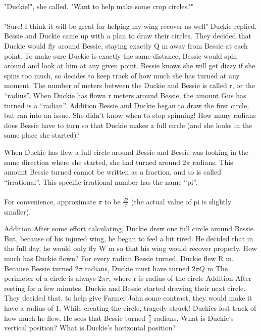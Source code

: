 \documentclass[a4paper,11pt ]{book}
\begin{document}
\paragraph{} "Duckie!", she called. "Want to help make some crop circles?"
\paragraph{} "Sure! I think it will be great for helping my wing recover as well" Duckie replied.
\vfill
\pagebreak
 {Bessie and Duckie came up with a plan to draw their circles. They decided that Duckie would fly around Bessie, staying exactly Q m away from Bessie at each point. To make sure Duckie is exactly the same distance, Bessie would spin around and look at him at any given point. Bessie knows she will get dizzy if she spins too much, so decides to keep track of how much she has turned at any moment.}
 {}
 {The number of meters between the Duckie and Bessie is called r, or the “radius”. When Duckie has flown r meters around Bessie, the amount Gus has turned is a “radian”.}
 {Addition}
 {Bessie and Duckie began to draw the first circle, but ran into an issue. She didn't know when to stop spinning! How many radians does Bessie have to turn so that Duckie makes a full circle (and she looks in the same place she started)?}
 {}
 {When Duckie has flew a full circle around Bessie and Bessie was looking in the same direction where she started, she had turned around 2$\pi$ radians. This amount Bessie turned cannot be written as a fraction, and so is called “irrational”. This specific irrational number has the name “pi”. 
 \paragraph{} For convenience, approximate $\pi$ to be $\frac{22}{7}$ (the actual value of pi is slightly smaller).}
 {Addition}
 {After some effort calculating, Duckie drew one full circle around Bessie. But, because of his injured wing, he began to feel a bit tired. He decided that in the full day, he would only fly W m so that his wing would recover properly. How much has Duckie flown?}
 {For every radian Bessie turned, Duckie flew R m. Because Bessie turned 2$\pi$ radians, Duckie must have turned $2\pi Q$ m}
 {The perimeter of a circle is always $2\pi r$, where r is radius of the circle}
 {Addition}
 {After resting for a few minutes, Duckie and Bessie started drawing their next circle. They decided that, to help give Farmer John some contrast, they would make it have a radius of 1. While creating the circle, tragedy struck! Duckies lost track of how much he flew. He sees that Bessie turned $\frac{\pi}{4}$ radians. What is Duckie's vertical position? What is Duckie's horizontal position?}
\end{document}
